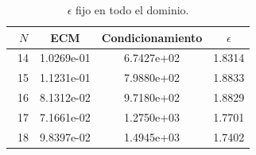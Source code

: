 \documentclass[11pt,a4paper]{article}
\begin{document}
\begin{table}
\caption{$\epsilon$ fijo en todo el dominio.}
\centering
\begin{tabular}{|c|c|c|c|}
\hline
\ $N$ & ECM & Condicionamiento & $\epsilon$ \\
\hline
\ 14 &1.0269e-01 & 6.7427e+02 & 1.8314 \\
\ 15 & 1.1231e-01 & 7.9880e+02 & 1.8833 \\
\ 16 & 8.1312e-02 & 9.7180e+02 & 1.8829 \\
\ 17 & 7.1661e-02 & 1.2750e+03 & 1.7701 \\
\ 18 &  9.8397e-02 & 1.4945e+03 & 1.7402 \\


\end{tabular}
\end{table}
\end{document}
